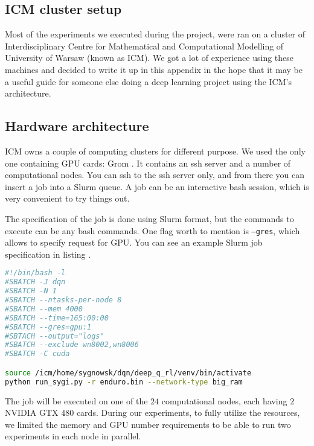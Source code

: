 \begin{appendices}
  
\chapter{ICM cluster setup}\label{icm}
Most of the experiments we executed during the project, were ran on a cluster of Interdisciplinary Centre for Mathematical and Computational Modelling of University of Warsaw (known as ICM). We got a lot of experience using these machines and decided to write it up in this appendix in the hope that it may be a useful guide for someone else doing a deep learning project using the ICM's architecture.

\section{Hardware architecture}
  ICM owns a couple of computing clusters for different purpose. We used the only one containing GPU cards: Grom \cite[in polish]{grom-icm}. It contains an ssh server and a number of computational nodes. You can ssh to the ssh server only, and from there you can insert a job into a Slurm \cite{slurm} queue. A job can be an interactive bash session, which is very convenient to try things out.
  
  The specification of the job is done using Slurm format, but the commands to execute can be any bash commands. One flag worth to mention is \texttt{--gres}, which allows to specify request for GPU. You can see an example Slurm job specification in listing \cite{slurm-file}.

  \begin{lstlisting}[language=bash, caption={Example Slurm job specification}, label={slurm-file}]
#!/bin/bash -l
#SBATCH -J dqn
#SBATCH -N 1
#SBATCH --ntasks-per-node 8
#SBATCH --mem 4000
#SBATCH --time=165:00:00
#SBATCH --gres=gpu:1
#SBTACH --output="logs"
#SBATCH --exclude wn8002,wn8006
#SBATCH -C cuda

source /icm/home/sygnowsk/dqn/deep_q_rl/venv/bin/activate
python run_sygi.py -r enduro.bin --network-type big_ram
\end{lstlisting}

The job will be executed on one of the $24$ computational nodes, each having $2$ NVIDIA GTX $480$ cards. During our experiments, to fully utilize the resources, we limited the memory and GPU number requirements to be able to run two experiments in each node in parallel.


\end{appendices}

